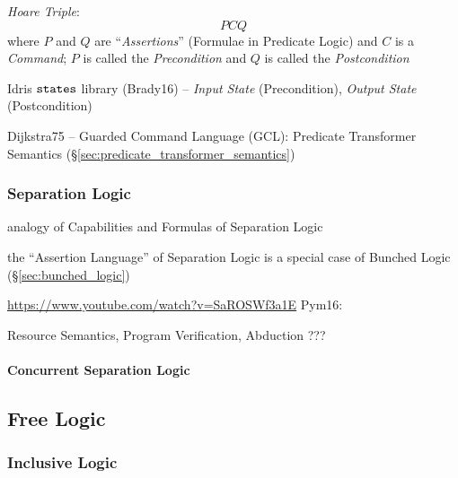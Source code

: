 \emph{Hoare Triple}:
\[
  {P} C {Q}
\]
where $P$ and $Q$ are ``\emph{Assertions}'' (Formulae in Predicate
Logic) and $C$ is a \emph{Command}; $P$ is called the
\emph{Precondition} and $Q$ is called the \emph{Postcondition}

Idris $\mathtt{states}$ library (Brady16) -- \emph{Input State}
(Precondition), \emph{Output State} (Postcondition)

Dijkstra75 -- Guarded Command Language (GCL): Predicate Transformer
Semantics (\S\ref{sec:predicate_transformer_semantics})



\subsubsection{Separation Logic}\label{sec:separation_logic}

analogy of Capabilities and Formulas of Separation Logic

the ``Assertion Language'' of Separation Logic is a special case of
Bunched Logic (\S\ref{sec:bunched_logic})


\url{https://www.youtube.com/watch?v=SaROSWf3a1E} Pym16:

Resource Semantics, Program Verification, Abduction ???



\paragraph{Concurrent Separation Logic}
\label{sec:concurrent_separation}\hfill



\subsection{Free Logic}\label{sec:free_logic}

\subsubsection{Inclusive Logic}\label{sec:inclusive_logic}



